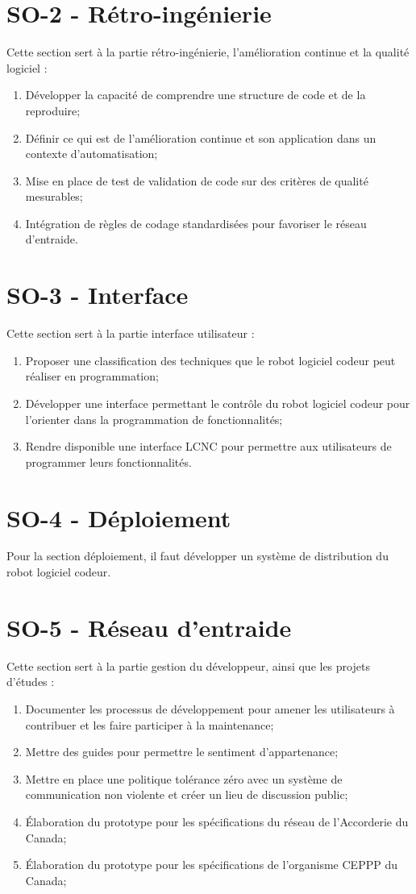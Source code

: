 \section{SO-2 - Rétro-ingénierie}
Cette section sert à la partie rétro-ingénierie, l'amélioration continue et la qualité logiciel :
\begin{enumerate}
    \item Développer la capacité de comprendre une structure de code et de la reproduire;
    \item Définir ce qui est de l’amélioration continue et son application dans un contexte d’automatisation;
    \item Mise en place de test de validation de code sur des critères de qualité mesurables;
    \item Intégration de règles de codage standardisées pour favoriser le réseau d’entraide.
\end{enumerate}

\section{SO-3 - Interface}
Cette section sert à la partie interface utilisateur :
\begin{enumerate}
    \item Proposer une classification des techniques que le robot logiciel codeur peut réaliser en programmation;
    \item Développer une interface permettant le contrôle du robot logiciel codeur pour l’orienter dans la programmation de fonctionnalités;
    \item Rendre disponible une interface LCNC pour permettre aux utilisateurs de programmer leurs fonctionnalités.
\end{enumerate}

\section{SO-4 - Déploiement}
Pour la section déploiement, il faut développer un système de distribution du robot logiciel codeur.

\section{SO-5 - Réseau d’entraide}
Cette section sert à la partie gestion du développeur, ainsi que les projets d'études :
\begin{enumerate}
    \item Documenter les processus de développement pour amener les utilisateurs à contribuer et les faire participer à la maintenance;
    \item Mettre des guides pour permettre le sentiment d'appartenance;
    \item Mettre en place une politique tolérance zéro avec un système de communication non violente et créer un lieu de discussion public;
    \item Élaboration du prototype pour les spécifications du réseau de l’Accorderie du Canada;
    \item Élaboration du prototype pour les spécifications de l’organisme CEPPP du Canada;
\end{enumerate}

